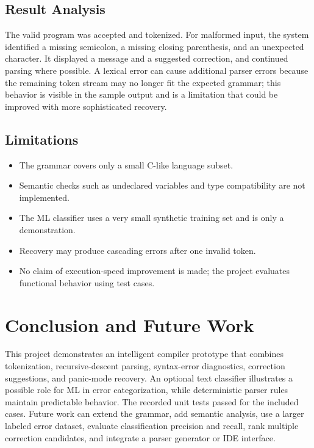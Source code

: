 \documentclass[12pt,a4paper]{article}
\begin{document}


\subsection{Result Analysis}
The valid program was accepted and tokenized. For malformed input, the system identified a missing semicolon, a missing closing parenthesis, and an unexpected character. It displayed a message and a suggested correction, and continued parsing where possible. A lexical error can cause additional parser errors because the remaining token stream may no longer fit the expected grammar; this behavior is visible in the sample output and is a limitation that could be improved with more sophisticated recovery.

\subsection{Limitations}
\begin{itemize}
\item The grammar covers only a small C-like language subset.
\item Semantic checks such as undeclared variables and type compatibility are not implemented.
\item The ML classifier uses a very small synthetic training set and is only a demonstration.
\item Recovery may produce cascading errors after one invalid token.
\item No claim of execution-speed improvement is made; the project evaluates functional behavior using test cases.
\end{itemize}

\section{Conclusion and Future Work}
This project demonstrates an intelligent compiler prototype that combines tokenization, recursive-descent parsing, syntax-error diagnostics, correction suggestions, and panic-mode recovery. An optional text classifier illustrates a possible role for ML in error categorization, while deterministic parser rules maintain predictable behavior. The recorded unit tests passed for the included cases. Future work can extend the grammar, add semantic analysis, use a larger labeled error dataset, evaluate classification precision and recall, rank multiple correction candidates, and integrate a parser generator or IDE interface.
\end{document}
